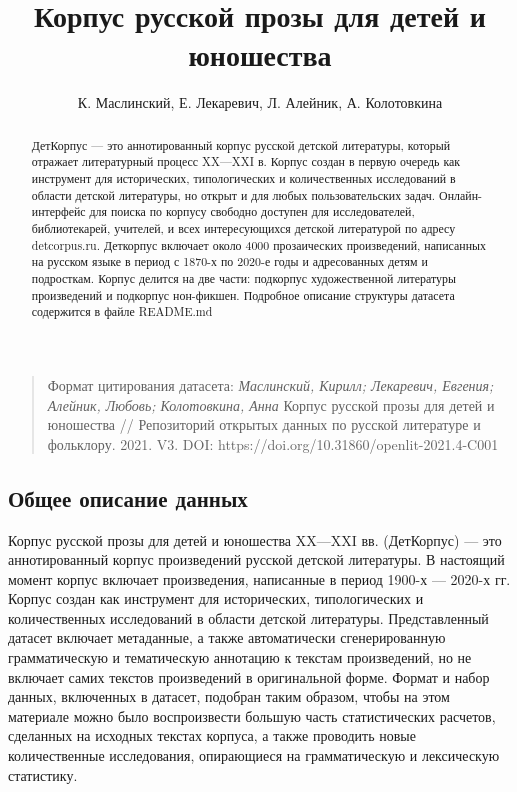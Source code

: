 \documentclass[
]{article}
\title{Корпус русской прозы для детей и юношества}
\author{К. Маслинский, Е. Лекаревич, Л. Алейник, А. Колотовкина}
\date{}
\begin{document}
\maketitle
\begin{abstract}
ДетКорпус --- это аннотированный корпус русской детской литературы,
который отражает литературный процесс XX---XXI в. Корпус создан в первую
очередь как инструмент для исторических, типологических и количественных
исследований в области детской литературы, но открыт и для любых
пользовательских задач. Онлайн-интерфейс для поиска по корпусу свободно
доступен для исследователей, библиотекарей, учителей, и всех
интересующихся детской литературой по адресу detcorpus.ru. Деткорпус
включает около 4000 прозаических произведений, написанных на русском
языке в период с 1870-х по 2020-е годы и адресованных детям и
подросткам. Корпус делится на две части: подкорпус художественной
литературы произведений и подкорпус нон-фикшен. Подробное описание
структуры датасета содержится в файле README.md
\end{abstract}

\begin{quote}
Формат цитирования датасета: \emph{Маслинский, Кирилл; Лекаревич,
Евгения; Алейник, Любовь; Колотовкина, Анна} Корпус русской прозы для детей и юношества //
Репозиторий открытых данных по русской литературе и фольклору. 2021. V3.
DOI: https://doi.org/10.31860/openlit-2021.4-C001
\end{quote}

\hypertarget{ux43eux431ux449ux435ux435-ux43eux43fux438ux441ux430ux43dux438ux435-ux434ux430ux43dux43dux44bux445}{%
\subsection{Общее описание
данных}\label{ux43eux431ux449ux435ux435-ux43eux43fux438ux441ux430ux43dux438ux435-ux434ux430ux43dux43dux44bux445}}

Корпус русской прозы для детей и юношества XX---XXI вв. (ДетКорпус) ---
это аннотированный корпус произведений русской детской литературы. В
настоящий момент корпус включает произведения, написанные в период
1900-х --- 2020-х гг. Корпус создан как инструмент для исторических,
типологических и количественных исследований в области детской
литературы. Представленный датасет включает метаданные, а также
автоматически сгенерированную грамматическую и тематическую аннотацию к
текстам произведений, но не включает самих текстов произведений в
оригинальной форме. Формат и набор данных, включенных в датасет,
подобран таким образом, чтобы на этом материале можно было воспроизвести
большую часть статистических расчетов, сделанных на исходных текстах
корпуса, а также проводить новые количественные исследования,
опирающиеся на грамматическую и лексическую статистику.
\end{document}
